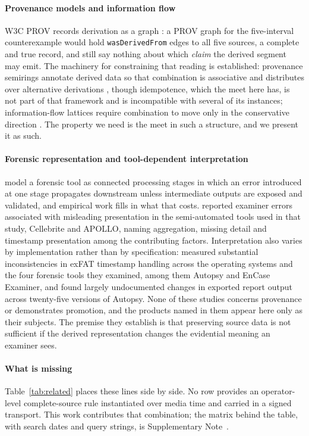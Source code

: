 \documentclass[preprint,3p,11pt,authoryear]{elsarticle}
\begin{document}
\paragraph{Provenance models and information flow} W3C PROV records derivation
as a graph \citep{w3c2013prov}: a PROV graph for the five-interval
counterexample would hold \texttt{wasDerivedFrom} edges to all five sources, a
complete and true record, and still say nothing about which \emph{claim} the
derived segment may emit. The machinery for constraining that reading is
established: provenance semirings annotate derived data so that combination is
associative and distributes over alternative derivations
\citep{green2007provenance}, though idempotence, which the meet here has, is
not part of that framework and is incompatible with several of its instances;
information-flow lattices require combination to move only in the conservative
direction \citep{denning1976lattice,goguen1982noninterference}. The property we
need is the meet in such a structure, and we present it as such.

\paragraph{Forensic representation and tool-dependent interpretation}
\citet{hargreaves2024abstract} model a forensic tool as connected processing
stages in which an error introduced at one stage propagates downstream unless
intermediate outputs are exposed and validated, and empirical work fills in
what that costs. \citet{andersen2025toolbias} reported examiner errors
associated with misleading presentation in the semi-automated tools used in
that study, Cellebrite and APOLLO, naming aggregation, missing detail and
timestamp presentation among the contributing factors. Interpretation also
varies by implementation rather than by specification:
\citet{nordvik2022exfat} measured substantial inconsistencies in exFAT
timestamp handling across the operating systems and the four forensic tools
they examined, among them Autopsy and EnCase Examiner, and
\citet{kuelper2026testdriven} found largely undocumented changes in exported
report output across twenty-five versions of Autopsy. None of these
studies concerns provenance or demonstrates promotion, and the products named
in them appear here only as their subjects. The premise they establish is that
preserving source data is not sufficient if the derived representation changes
the evidential meaning an examiner sees.

\paragraph{What is missing} Table~\ref{tab:related} places these lines side by side.
No row provides an operator-level complete-source rule instantiated over media
time and carried in a signed transport. This work contributes that combination;
the matrix behind the table, with search dates and query
strings, is Supplementary Note~\NoteNovelty{}.
\end{document}

